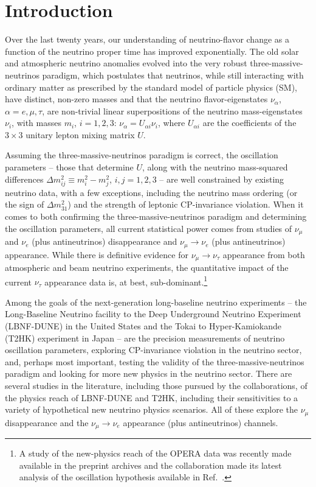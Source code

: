 \documentclass[aps,prd,onecolumn,nofootinbib,superscriptaddress, 11pt]{revtex4}
\begin{document}
\setcounter{equation}{0}
\section{Introduction}
\label{sec:introduction}

Over the last twenty years, our understanding of neutrino-flavor change as a function of the neutrino proper time has improved exponentially. The old solar and atmospheric neutrino anomalies evolved into the very robust three-massive-neutrinos paradigm, which postulates that neutrinos, while still interacting with ordinary matter as prescribed by the standard model of particle physics (SM), have distinct, non-zero masses and that the neutrino flavor-eigenstates $\nu_{\alpha}$, $\alpha=e,\mu,\tau$, are non-trivial linear superpositions of the neutrino mass-eigenstates $\nu_i$, with masses $m_i$, $i=1,2,3$: $\nu_{\alpha}=U_{\alpha i}\nu_i$, where $U_{\alpha i}$ are the coefficients of the $3\times 3$ unitary lepton mixing matrix $U$. 

Assuming the three-massive-neutrinos paradigm is correct, the oscillation parameters -- those that determine $U$, along with the neutrino mass-squared differences $\Delta m^2_{ij} \equiv m_i^2-m_j^2$, $i,j=1,2,3$ -- are well constrained by existing neutrino data, with a few exceptions, including the neutrino mass ordering (or the sign of $\Delta m^2_{31}$) and the strength of leptonic CP-invariance violation. When it comes to both confirming the three-massive-neutrinos paradigm and determining the oscillation parameters, all current statistical power comes from studies of $\nu_{\mu}$ and $\nu_e$ (plus antineutrinos) disappearance and $\nu_{\mu}\to\nu_e$ (plus antineutrinos) appearance. While there is definitive evidence for $\nu_{\mu}\to\nu_{\tau}$ appearance from both atmospheric \cite{Abe:2012jj,Li:2017dbe,Aartsen:2019tjl} and beam \cite{Agafonova:2015jxn} neutrino experiments, the quantitative impact of the current $\nu_{\tau}$ appearance data is, at best, sub-dominant.\footnote{A study of the new-physics reach of the OPERA data was recently made available in the preprint archives \cite{Meloni:2019pse} and the collaboration made its latest analysis of the oscillation hypothesis available in Ref.~\cite{Agafonova:2019npf}.}

Among the goals of the next-generation long-baseline neutrino experiments -- the Long-Baseline Neutrino facility to the Deep Underground Neutrino Experiment (LBNF-DUNE) in the United States and the Tokai to Hyper-Kamiokande (T2HK) experiment in Japan -- are the precision measurements of neutrino oscillation parameters, exploring CP-invariance violation in the neutrino sector, and, perhaps most important, testing the validity of the three-massive-neutrinos paradigm and looking for more new physics in the neutrino sector. There are several studies in the literature, including those pursued by the collaborations, of the physics reach of LBNF-DUNE and T2HK, including their sensitivities to a variety of hypothetical new neutrino physics scenarios. All of these explore the $\nu_{\mu}$ disappearance and the $\nu_{\mu}\to\nu_e$ appearance (plus antineutrinos) channels. 
\end{document}
